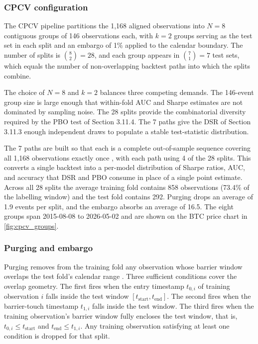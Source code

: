 \documentclass[12pt,a4paper,oneside]{article}
\begin{document}
\subsubsection{CPCV configuration}\label{subsubsec:cpcv_config}

The CPCV pipeline partitions the 1,168 aligned observations into $N = 8$ contiguous groups of 146 observations each, with $k = 2$ groups serving as the test set in each split and an embargo of 1\% applied to the calendar boundary. The number of splits is $\binom{8}{2} = 28$, and each group appears in $\binom{7}{1} = 7$ test sets, which equals the number of non-overlapping backtest paths into which the splits combine.

The choice of $N = 8$ and $k = 2$ balances three competing demands. The 146-event group size is large enough that within-fold AUC and Sharpe estimates are not dominated by sampling noise. The 28 splits provide the combinatorial diversity required by the PBO test of Section 3.11.4. The 7 paths give the DSR of Section 3.11.3 enough independent draws to populate a stable test-statistic distribution.

The 7 paths are built so that each is a complete out-of-sample sequence covering all 1,168 observations exactly once \citep[Section 12.4.1]{lopez_de_prado_2018}, with each path using 4 of the 28 splits. This converts a single backtest into a per-model distribution of Sharpe ratios, AUC, and accuracy that DSR and PBO consume in place of a single point estimate. Across all 28 splits the average training fold contains 858 observations (73.4\% of the labelling window) and the test fold contains 292. Purging drops an average of 1.9 events per split, and the embargo absorbs an average of 16.5. The eight groups span 2015-08-08 to 2026-05-02 and are shown on the BTC price chart in \label{ref:cpcv_groups_call}\autoref{fig:cpcv_groups}.


\subsubsection{Purging and embargo}\label{subsubsec:purging_embargo}

Purging removes from the training fold any observation whose barrier window overlaps the test fold's calendar range \citep[Snippet 7.1]{lopez_de_prado_2018}. Three sufficient conditions cover the overlap geometry. The first fires when the entry timestamp $t_{0,i}$ of training observation $i$ falls inside the test window $[t_{\text{start}}, t_{\text{end}}]$. The second fires when the barrier-touch timestamp $t_{1,i}$ falls inside the test window. The third fires when the training observation's barrier window fully encloses the test window, that is, $t_{0,i} \leq t_{\text{start}}$ and $t_{\text{end}} \leq t_{1,i}$. Any training observation satisfying at least one condition is dropped for that split.
\end{document}
